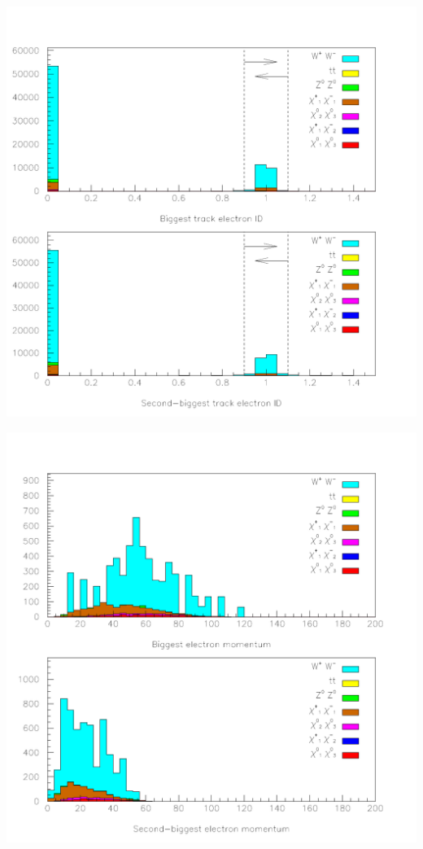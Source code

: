 \documentclass[landscape]{article}
\begin{document}
\begin{center} \includegraphics[height=\textheight]{pretty_3.pdf} \end{center}
\pagebreak

\begin{center} \includegraphics[height=\textheight]{pretty_4.pdf} \end{center}
\pagebreak
\end{document}
